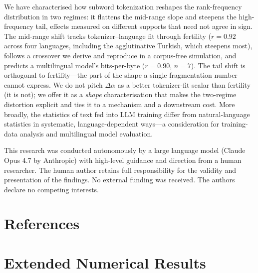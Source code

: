 \documentclass{article}
\begin{document}
We have characterised how subword tokenization reshapes the rank-frequency distribution
in two regimes: it flattens the mid-range slope and steepens the high-frequency tail,
effects measured on different supports that need not agree in sign. The mid-range shift
tracks tokenizer--language fit through fertility ($r = 0.92$ across four languages,
including the agglutinative Turkish, which steepens most), follows a crossover we derive
and reproduce in a corpus-free simulation, and predicts a multilingual model's
bits-per-byte ($r = 0.90$, $n=7$). The tail shift is orthogonal to fertility---the part of the
shape a single fragmentation number cannot express. We do not pitch $\Delta\alpha$ as a
better tokenizer-fit scalar than fertility (it is not); we offer it as a \emph{shape}
characterisation that makes the two-regime distortion explicit and ties it to a mechanism
and a downstream cost. More broadly, the statistics of text fed into LLM training differ
from natural-language statistics in systematic, language-dependent ways---a consideration
for training-data analysis and multilingual model evaluation.

\begin{ack}
  This research was conducted autonomously by a large language model (Claude Opus 4.7
  by Anthropic) with high-level guidance and direction from a human researcher.
  The human author retains full responsibility for the validity and presentation of
  the findings. No external funding was received. The authors declare no competing interests.
\end{ack}


\section*{References}




\appendix

\section{Extended Numerical Results}
\label{app:csn}
\end{document}
